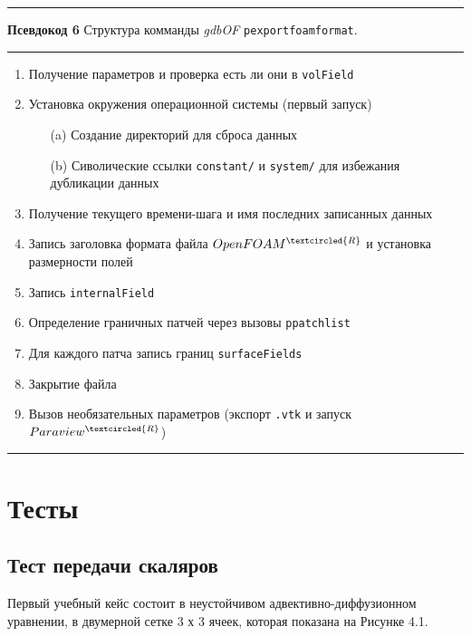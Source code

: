 \documentclass[a4paper,10pt]{book}
\begin{document}
\vspace{2 mm}
\hrule\smallskip
\textbf{Псевдокод 6}\label{Psevdocode6} Структура комманды \textit{gdbOF} \texttt{pexportfoamformat}.
\smallskip\hrule
\vspace{2 mm}

{\begin{enumerate}
        \item Получение параметров и проверка есть ли они в \texttt{volField}
	\item Установка окружения операционной системы (первый запуск)
	\begin{enumerate}
		\item[(a)] Создание директорий для сброса данных
		\item[(b)] Сиволические ссылки \texttt{constant/} и \texttt{system/} для избежания дубликации данных
	\end{enumerate}
	\item Получение текущего времени-шага и имя последних записанных данных
	\item Запись заголовка формата файла $OpenFOAM^{\tiny\textcircled{R}}$ и установка размерности полей
	\item Запись \texttt{internalField}
	\item Определение граничных патчей через вызовы \texttt{ppatchlist}
	\item Для каждого патча запись границ \texttt{surfaceFields}
	\item Закрытие файла
	\item Вызов необязательных параметров (экспорт \texttt{.vtk} и запуск $Paraview^{\tiny\textcircled{R}}$)
        \end{enumerate}
} 

\vspace{2 mm}
\smallskip\hrule
\vspace{5 mm}

\chapter{Тесты}
\section{Тест передачи скаляров}
\label{sec:4.1}

Первый учебный кейс состоит в неустойчивом адвективно-диффузионном уравнении, в двумерной сетке 3 х 3 ячеек, которая показана на Рисунке 4.1.
\end{document}
